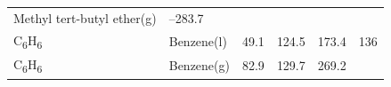 \documentclass[
]{book}
\theoremstyle{definition}
\theoremstyle{definition}
\theoremstyle{definition}
\theoremstyle{remark}
\begin{document}
\begin{longtable}[]{@{}llllll@{}}
\begin{minipage}[t]{0.17\columnwidth}
Methyl tert-butyl
ether(g)\strut
\end{minipage} & \begin{minipage}[t]{0.15\columnwidth}\raggedright
--283.7\strut
\end{minipage} & \begin{minipage}[t]{0.15\columnwidth}\raggedright
\strut
\end{minipage} & \begin{minipage}[t]{0.14\columnwidth}\raggedright
\strut
\end{minipage} & \begin{minipage}[t]{0.14\columnwidth}\raggedright
\strut
\end{minipage}\tabularnewline
\begin{minipage}[t]{0.07\columnwidth}\raggedright
C\textsubscript{6}H\textsubscript{6}\strut
\end{minipage} & \begin{minipage}[t]{0.17\columnwidth}\raggedright
Benzene(l)\strut
\end{minipage} & \begin{minipage}[t]{0.15\columnwidth}\raggedright
49.1\strut
\end{minipage} & \begin{minipage}[t]{0.15\columnwidth}\raggedright
124.5\strut
\end{minipage} & \begin{minipage}[t]{0.14\columnwidth}\raggedright
173.4\strut
\end{minipage} & \begin{minipage}[t]{0.14\columnwidth}\raggedright
136\strut
\end{minipage}\tabularnewline
\begin{minipage}[t]{0.07\columnwidth}\raggedright
C\textsubscript{6}H\textsubscript{6}\strut
\end{minipage} & \begin{minipage}[t]{0.17\columnwidth}\raggedright
Benzene(g)\strut
\end{minipage} & \begin{minipage}[t]{0.15\columnwidth}\raggedright
82.9\strut
\end{minipage} & \begin{minipage}[t]{0.15\columnwidth}\raggedright
129.7\strut
\end{minipage} & \begin{minipage}[t]{0.14\columnwidth}\raggedright
269.2\strut
\end{minipage} & \begin{minipage}[t]{0.14\columnwidth}\raggedright

\end{minipage}
\end{longtable}
\end{document}
